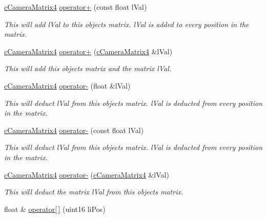 \begin{DoxyCompactItemize}
\hyperlink{classc_camera_matrix4}{cCameraMatrix4} \hyperlink{classc_camera_matrix4_adb619821208a735d6fd262770d0dbf8a}{operator+} (const float lVal)
\begin{DoxyCompactList}\small\item\em This will add lVal to this objects matrix. lVal is added to every position in the matrix. \item\end{DoxyCompactList}\item 
\hyperlink{classc_camera_matrix4}{cCameraMatrix4} \hyperlink{classc_camera_matrix4_a4456564f6c57e7a9072ab31c242bef49}{operator+} (\hyperlink{classc_camera_matrix4}{cCameraMatrix4} \&lVal)
\begin{DoxyCompactList}\small\item\em This will add this objects matrix and the matrix lVal. \item\end{DoxyCompactList}\item 
\hyperlink{classc_camera_matrix4}{cCameraMatrix4} \hyperlink{classc_camera_matrix4_a42eb30055c9b58f2fc3fabf8201e7929}{operator-\/} (float \&lVal)
\begin{DoxyCompactList}\small\item\em This will deduct lVal from this objects matrix. lVal is deducted from every position in the matrix. \item\end{DoxyCompactList}\item 
\hyperlink{classc_camera_matrix4}{cCameraMatrix4} \hyperlink{classc_camera_matrix4_a3f13c8e5f71d9c158332fe87a49f1b61}{operator-\/} (const float lVal)
\begin{DoxyCompactList}\small\item\em This will deduct lVal from this objects matrix. lVal is deducted from every position in the matrix. \item\end{DoxyCompactList}\item 
\hyperlink{classc_camera_matrix4}{cCameraMatrix4} \hyperlink{classc_camera_matrix4_a97c7f6820b87ea9a217c4412e0c89e49}{operator-\/} (\hyperlink{classc_camera_matrix4}{cCameraMatrix4} \&lVal)
\begin{DoxyCompactList}\small\item\em This will deduct the matrix lVal from this objects matrix. \item\end{DoxyCompactList}\item 
float \& \hyperlink{classc_camera_matrix4_a57bce39e1e5ff464edd9dd1c32fcdd3b}{operator\mbox{[}$\,$\mbox{]}} (uint16 liPos)

\end{DoxyCompactItemize}
